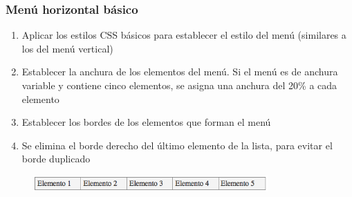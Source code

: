 \documentclass[ucs]{beamer}
\begin{document}
\begin{frame}
\frametitle{Menú horizontal básico}

\begin{enumerate}
  \item Aplicar los estilos CSS básicos para establecer el estilo del menú (similares a los del menú vertical)
  \item  Establecer la anchura de los elementos del menú. Si el menú es de anchura variable y contiene cinco elementos, se asigna una anchura del 20\% a cada elemento
  \item Establecer los bordes de los elementos que forman el menú
  \item Se elimina el borde derecho del último elemento de la lista, para evitar el borde duplicado
\end{enumerate}


\begin{center}
\begin{figure}[p]
\includegraphics[width=0.8\textwidth]{figs/f0909.png}
\end{figure}
\end{center}

\end{frame}






%
\end{document}
